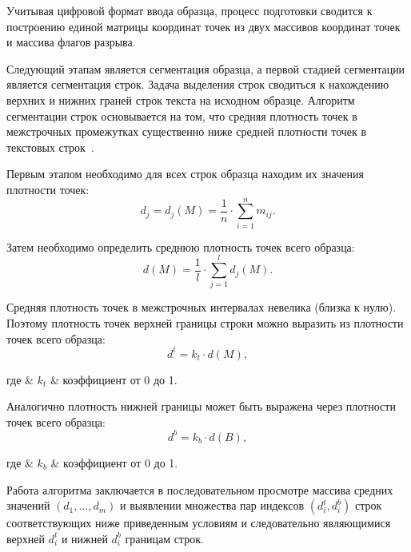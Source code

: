 Учитывая цифровой формат ввода образца, процесс подготовки сводится к построению единой матрицы координат точек из двух массивов координат точек и массива флагов разрыва.

Следующий этапам является сегментация образца, а первой стадией сегментации является сегментация строк.
Задача выделения строк сводиться к нахождению верхних и нижних граней строк текста на исходном образце. Алгоритм сегментации строк основывается на том, что средняя плотность точек в межстрочных промежутках существенно ниже средней плотности точек в текстовых строк~\cite{cv_text_image_segmentator}.

Первым этапом необходимо для всех строк образца находим их значения плотности точек:
\begin{equation}
  \label{eq:architecture:line_medium_brigth}
  d_j = d_j(M) = \frac{1}{n}\cdot\sum\limits_{i=1}^{n} m_{ij}.
\end{equation}

Затем необходимо определить среднюю плотность точек всего образца:
\begin{equation}
  \label{eq:architecture:medium_brigth}
  d(M) = \frac{1}{l}\cdot\sum\limits_{j=1}^{l} d_j(M).
\end{equation}

Средняя плотность точек в межстрочных интервалах невелика (близка к нулю). Поэтому плотность точек верхней границы строки можно выразить из плотности точек всего образца:
\begin{equation}
  \label{eq:architecture:line_up_interval_medium_brigth}
  d^{t} = k_{t} \cdot d(M),
\end{equation}
\begin{explanation}
где & $ k_{t} $ & коэффициент от 0 до 1.
\end{explanation}

Аналогично плотность нижней границы может быть выражена через плотности точек всего образца:
\begin{equation}
  \label{eq:architecture:line_down_interval_medium_brigth}
  d^{b} = k_{b} \cdot d(B),
\end{equation}
\begin{explanation}
где & $ k_{b} $ & коэффициент от 0 до 1.
\end{explanation}

Работа алгоритма заключается в последовательном просмотре массива средних значений $ (d_1,...,d_m) $ и выявлении множества пар индексов $ (d^t_i,d^b_i) $ строк соответствующих ниже приведенным условиям и следовательно являющимися верхней $ d^t_i $ и нижней $ d^b_i $ границам строк.

